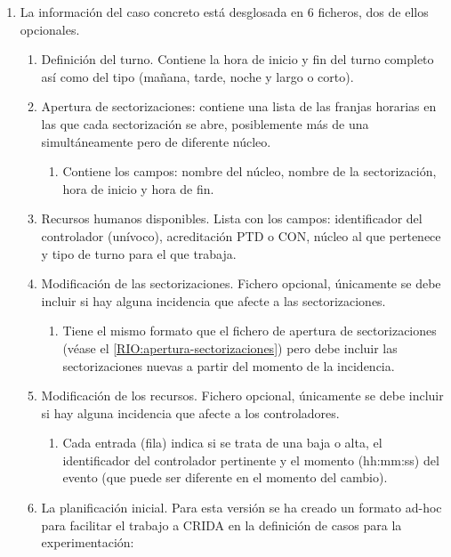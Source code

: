 \begin{enumerate}[label={\textbf{RIO\arabic*}}, ref={Requisito RIO\arabic*},  align=left]
	\item La información del caso concreto está desglosada en 6 ficheros, dos de ellos opcionales.
	\begin{enumerate}[label*={\textbf{.\arabic*}}, ref={\theenumi.\arabic*}]
		\item Definición del turno. Contiene la hora de inicio y fin del turno completo así como del tipo (mañana, tarde, noche y largo o corto).
		\item \label{RIO:apertura-sectorizaciones} Apertura de sectorizaciones: contiene una lista de las franjas horarias en las que cada sectorización se abre, posiblemente más de una simultáneamente pero de diferente núcleo.
		\begin{enumerate}[label*={\textbf{.\arabic*}}]
			\item Contiene los campos: nombre del núcleo, nombre de la sectorización, hora de inicio y hora de fin.
		\end{enumerate}
		\item \label{RIO:rrhh-disponibles}  Recursos humanos disponibles. Lista con los campos: identificador del controlador (unívoco), acreditación PTD o CON, núcleo al que pertenece y tipo de turno para el que trabaja.
		\item Modificación de las sectorizaciones. Fichero opcional, únicamente se debe incluir si hay alguna incidencia que afecte a las sectorizaciones.
		\begin{enumerate}[label*={\textbf{.\arabic*}}]
			\item Tiene el mismo formato que el fichero de apertura de sectorizaciones (véase el \ref{RIO:apertura-sectorizaciones}) pero debe incluir las sectorizaciones nuevas a partir del momento de la incidencia.
		\end{enumerate}
		\item Modificación de los recursos. Fichero opcional, únicamente se debe incluir si hay alguna incidencia que afecte a los controladores.
		\begin{enumerate}[label*={\textbf{.\arabic*}}]
			\item Cada entrada (fila) indica si se trata de una baja o alta, el identificador del controlador pertinente y el momento (hh:mm:ss) del evento (que puede ser diferente en el momento del cambio).
		\end{enumerate}
		\item La planificación inicial. Para esta versión se ha creado un formato ad-hoc para facilitar el trabajo a \gls{CRIDA} en la definición de casos para la experimentación:

\end{enumerate}
\end{enumerate}
